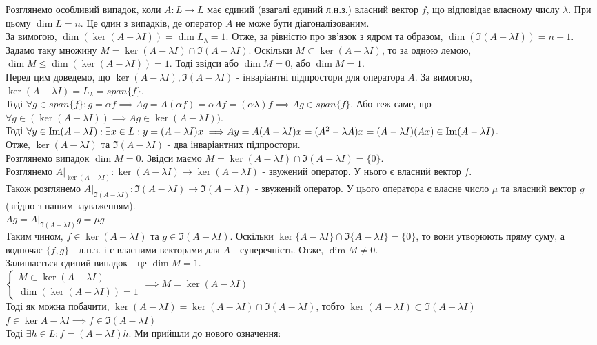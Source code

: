 \documentclass[a4paper, 10pt]{article}
\theoremstyle{theoremdd}
\begin{document}
\iffalse
Розглянемо особливий випадок, коли $A: L \to L$ має єдиний (взагалі єдиний л.н.з.) власний вектор $f$, що відповідає власному числу $\lambda$. При цьому $\dim L = n$. Це один з випадків, де оператор $A$ не може бути діагоналізованим.\\
За вимогою, $\dim (\ker(A - \lambda I)) = \dim L_{\lambda} = 1$. Отже, за рівністю про зв'язок з ядром та образом, $\dim (\Im (A - \lambda I)) = n-1$.\\
Задамо таку множину $M=\ker(A-\lambda I) \cap \Im(A-\lambda I)$. Оскільки $M \subset \ker (A-\lambda I)$, то за одною лемою, $\dim M \leq \dim(\ker (A-\lambda I)) = 1$.
Тоді звідси або $\dim M = 0$, або $\dim M = 1$.
\bigskip \\
Перед цим доведемо, що $\ker(A - \lambda I), \Im(A-\lambda I)$ - інваріантні підпростори для оператора $A$. За вимогою, $\ker(A-\lambda I) = L_{\lambda} = span\{f\}$.\\
Тоді $\forall g \in span\{f\}: g = \alpha f \implies Ag = A(\alpha f) = \alpha Af = (\alpha \lambda) f \implies Ag \in span\{f\}$. Або теж саме, що $\forall g \in (\ker(A - \lambda I)) \implies Ag \in  \ker(A - \lambda I))$.
\bigskip \\
Тоді $\forall y \in \Im(A-\lambda I): \exists x \in L: y = (A-\lambda I)x \implies \\ Ay = A(A-\lambda I)x = (A^2-\lambda A)x = (A-\lambda I)(Ax) \in \Im(A-\lambda I)$.\\
Отже, $\ker(A-\lambda I)$ та $\Im(A-\lambda I)$ - два інваріантних підпростори.
\bigskip \\
Розглянемо випадок $\dim M = 0$. Звідси маємо $M = \ker(A-\lambda I) \cap \Im(A-\lambda I) = \{0\}$.\\
Розглянемо $A |_{\ker(A-\lambda I)}: \ker(A-\lambda I) \to \ker(A-\lambda I)$ - звужений оператор. У нього є власний вектор $f$.\\
Також розглянемо $A |_{\Im(A-\lambda I)}: \Im(A-\lambda I) \to \Im(A-\lambda I)$ - звужений оператор. У цього оператора є власне число $\mu$ та власний вектор $g$ (згідно з нашим зауваженням).\\
$Ag = A |_{\Im(A-\lambda I)} g = \mu g$\\
Таким чином, $f \in \ker(A-\lambda I)$ та $g \in \Im(A-\lambda I)$. Оскільки $\ker \{ A-\lambda I \} \cap \Im \{ A - \lambda I \} = \{ 0 \}$, то вони утворюють пряму суму, а водночас $\{f,g\}$ - л.н.з. і є власними векторами для $A$ - суперечність. Отже, $\dim M \neq 0$.
\bigskip \\
Залишається єдиний випадок - це $\dim M = 1$.\\
$\begin{cases}
M \subset \ker(A-\lambda I)\\
\dim{(\ker(A-\lambda I))} = 1
\end{cases}
\implies M = \ker(A-\lambda I)$
\bigskip \\
Тоді як можна побачити, $\ker(A-\lambda I) = \ker(A-\lambda I) \cap \Im (A - \lambda I)$, тобто $\ker(A-\lambda I) \subset \Im(A-\lambda I)$\\
$f \in \ker{A- \lambda I} \implies f \in \Im(A - \lambda I)$\\
Тоді $\exists h \in L: f = (A-\lambda I)h$. Ми прийшли до нового означення:
\end{document}
